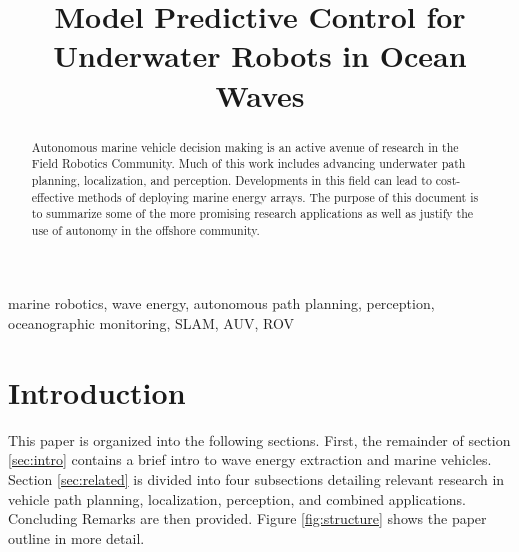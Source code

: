 \documentclass[conference]{IEEEtran}
\begin{document}

\title{Model Predictive Control for\\Underwater Robots in Ocean Waves}

\author{
\and
{}
}

\maketitle


\begin{abstract}
Autonomous marine vehicle decision making is an active avenue of research in the Field Robotics Community. Much of this work includes advancing underwater path planning, localization, and perception. Developments in this field can lead to cost-effective methods of deploying marine energy arrays. The purpose of this document is to summarize some of the more promising research applications as well as justify the use of autonomy in the offshore community.  
\end{abstract}

\begin{IEEEkeywords}	
marine robotics, wave energy, autonomous path planning, perception, oceanographic monitoring, SLAM, AUV, ROV
\end{IEEEkeywords}

\section{Introduction} 
\label{sec:introduction}

This paper is organized into the following sections. First, the remainder of section \ref{sec:intro} contains a brief intro to wave energy extraction and marine vehicles. Section \ref{sec:related} is divided into four subsections detailing relevant research in vehicle path planning, localization, perception, and combined applications. Concluding Remarks are then provided. Figure \ref{fig:structure} shows the paper outline in more detail. 
\end{document}
